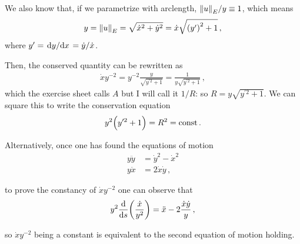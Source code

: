 \documentclass[main.tex]{subfiles}
\begin{document}
We also know that, if we parametrize with arclength, \(\norm{u}_{E} / y \equiv 1 \), which means 
%
\begin{align}
  y = \norm{u}_{E} = \sqrt{\dot{x}^2 + \dot{y}^2} = \dot{x} \sqrt{\qty(y^{\prime })^2 + 1}
\,,
\end{align}
%
where \(y^{\prime } = \dv*{y}{x} = \dot{y} / \dot{x}\).

Then, the conserved quantity can be rewritten as 
%
\begin{align}
  \dot{x} y^{-2} = y^{-2} \frac{y}{\sqrt{y^{\prime 2} +1}}
  = \frac{1}{y \sqrt{y^{\prime 2} + 1}}
\,,
\end{align}
%
which the exercise sheet calls \(A\) but I will call it \(1/R\): so \(R = y \sqrt{y^{\prime 2}+1}\). We can square this to write the conservation equation 
%
\begin{align}
  y^2 \qty(y^{\prime 2} + 1 ) = R^2 = \text{const}
\,.
\end{align}
%

Alternatively, once one has found the equations of motion
%
\begin{subequations}
\begin{align}
  y \ddot{y} &= \dot{y}^2 - \dot{x}^2  \\
  y \ddot{x} &= 2 \dot{x} \dot{y} 
\,,
\end{align}
\end{subequations}

to prove the constancy of \(\dot{x}
 y^{-2}\) one can observe that 
%
\begin{align}
  y^2 \dv{}{s} \qty(\frac{\dot{x}}{y^2})
  = \ddot{x} - 2 \frac{\dot{x} \dot{y}}{y}
\,,
\end{align}
%

so \(\dot{x} y^{-2}\) being a constant is equivalent to the second equation of motion holding.




\end{document}
